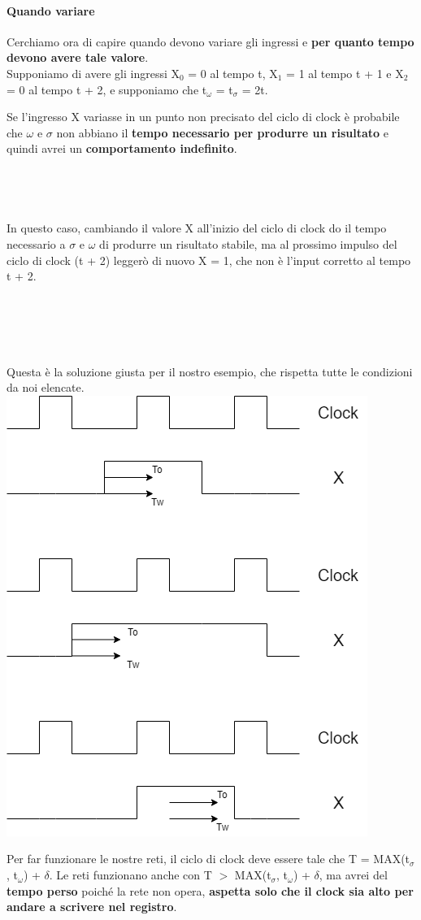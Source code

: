 \documentclass[10pt]{report}
\begin{document}
\paragraph{Quando variare} Cerchiamo ora di capire quando devono variare gli ingressi e \textbf{per quanto tempo devono avere tale valore}.\\
Supponiamo di avere gli ingressi X$_0$ = 0 al tempo t, X$_1$ = 1 al tempo t + 1 e X$_2$ = 0 al tempo t + 2, e supponiamo che t$_\omega$ = t$_\sigma$ = 2t.
\begin{multicols}{2}
Se l'ingresso X variasse in un punto non precisato del ciclo di clock è probabile che $\omega$ e $\sigma$ non abbiano il \textbf{tempo necessario per produrre un risultato} e quindi avrei un \textbf{comportamento indefinito}.\\\\\\\\\\
In questo caso, cambiando il valore X all'inizio del ciclo di clock do il tempo necessario a $\sigma$ e $\omega$ di produrre un risultato stabile, ma al prossimo impulso del ciclo di clock (t + 2) leggerò di nuovo X = 1, che non è l'input corretto al tempo t + 2.\\\\\\\\\\\\
Questa è la soluzione giusta per il nostro esempio, che rispetta tutte le condizioni da noi elencate.
\includegraphics[scale=0.5]{sincronoesempi.png}
\end{multicols}
Per far funzionare le nostre reti, il ciclo di clock deve essere tale che T = MAX(t$_\sigma$, t$_\omega$) + $\delta$. Le reti funzionano anche con T $>$ MAX(t$_\sigma$, t$_\omega$) + $\delta$, ma avrei del \textbf{tempo perso} poiché la rete non opera, \textbf{aspetta solo che il clock sia alto per andare a scrivere nel registro}.
\pagebreak
\end{document}

